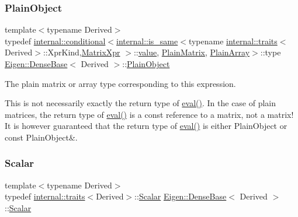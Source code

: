 \subsubsection{\texorpdfstring{PlainObject}{PlainObject}}
{\footnotesize\ttfamily template$<$typename Derived$>$ \\
typedef \mbox{\hyperlink{struct_eigen_1_1internal_1_1conditional}{internal\+::conditional}}$<$\mbox{\hyperlink{struct_eigen_1_1internal_1_1is__same}{internal\+::is\+\_\+same}}$<$typename \mbox{\hyperlink{struct_eigen_1_1internal_1_1traits}{internal\+::traits}}$<$Derived$>$\+::Xpr\+Kind,\mbox{\hyperlink{struct_eigen_1_1_matrix_xpr}{Matrix\+Xpr}} $>$\+::\mbox{\hyperlink{class_eigen_1_1_dense_base_a8da735a6bfc7012606acf787156d10a0}{value}}, \mbox{\hyperlink{class_eigen_1_1_dense_base_aa301ef39d63443e9ef0b84f47350116e}{Plain\+Matrix}}, \mbox{\hyperlink{class_eigen_1_1_dense_base_a65328b7d6fc10a26ff6cd5801a6a44eb}{Plain\+Array}}$>$\+::type \mbox{\hyperlink{class_eigen_1_1_dense_base}{Eigen\+::\+Dense\+Base}}$<$ Derived $>$\+::\mbox{\hyperlink{class_eigen_1_1_dense_base_aae45af9b5aca5a9caae98fd201f47cc4}{Plain\+Object}}}



The plain matrix or array type corresponding to this expression. 

This is not necessarily exactly the return type of \mbox{\hyperlink{class_eigen_1_1_dense_base_a5df64c66228ba75bbc66db2584185527}{eval()}}. In the case of plain matrices, the return type of \mbox{\hyperlink{class_eigen_1_1_dense_base_a5df64c66228ba75bbc66db2584185527}{eval()}} is a const reference to a matrix, not a matrix! It is however guaranteed that the return type of \mbox{\hyperlink{class_eigen_1_1_dense_base_a5df64c66228ba75bbc66db2584185527}{eval()}} is either Plain\+Object or const Plain\+Object\&. \mbox{\label{class_eigen_1_1_dense_base_a5feed465b3a8e60c47e73ecce83e39a2}} 
\subsubsection{\texorpdfstring{Scalar}{Scalar}}
{\footnotesize\ttfamily template$<$typename Derived$>$ \\
typedef \mbox{\hyperlink{struct_eigen_1_1internal_1_1traits}{internal\+::traits}}$<$Derived$>$\+::\mbox{\hyperlink{class_eigen_1_1_dense_base_a5feed465b3a8e60c47e73ecce83e39a2}{Scalar}} \mbox{\hyperlink{class_eigen_1_1_dense_base}{Eigen\+::\+Dense\+Base}}$<$ Derived $>$\+::\mbox{\hyperlink{class_eigen_1_1_dense_base_a5feed465b3a8e60c47e73ecce83e39a2}{Scalar}}}

